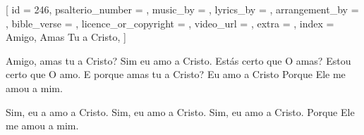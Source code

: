
[
    id                     = {246},
    psalterio_number       = {},
    music_by               = {},
    lyrics_by              = {},
    arrangement_by         = {},
    bible_verse            = {},
    licence_or_copyright   = {},
    video_url              = {},
    extra                  = {},
    index                  = {Amigo, Amas Tu a Cristo},
]


\beginverse
Amigo, amas tu a Cristo?
Sim eu amo a Cristo.
Estás certo que O amas?
Estou certo que O amo.
E porque amas tu a Cristo?
Eu amo a Cristo
Porque Ele me amou a mim.
\endverse


\beginchorus

Sim, eu a amo a Cristo.
Sim, eu amo a Cristo.
Sim, eu amo a Cristo.
Porque Ele me amou a mim.

\endchorus



\endsong
